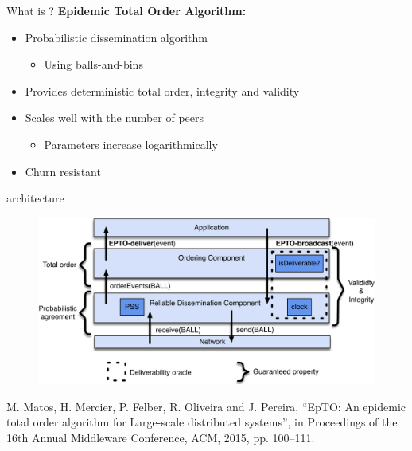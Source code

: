 \subtitle[Description]{Description}

\begin{frame}{What is \epto{}?}
	\textbf{Epidemic Total Order Algorithm:}
	\begin{itemize}
		\item Probabilistic dissemination algorithm
			\begin{itemize}
				\item Using balls-and-bins
			\end{itemize}
		\item Provides deterministic total order,  integrity and validity
		\item Scales well with the number of peers
			\begin{itemize}
				\item Parameters increase logarithmically
			\end{itemize}
		\item Churn resistant
	\end{itemize}
\end{frame}


\begin{frame}{\epto{} architecture}
    \begin{figure}
        \includegraphics[scale=0.5]{figures/architecture}
    \end{figure}
\tiny{M. Matos, H. Mercier, P. Felber, R. Oliveira and J. Pereira, “EpTO: An epidemic total order algorithm for Large-scale distributed systems”, in Proceedings of the 16th Annual Middleware Conference, ACM, 2015, pp. 100–111.
}
\end{frame}

